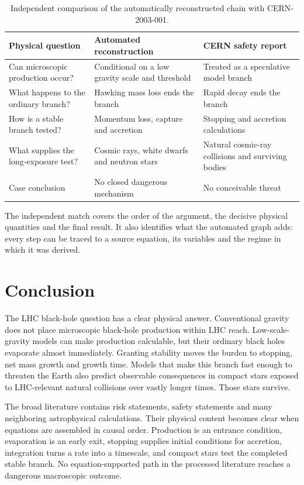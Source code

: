 \documentclass[11pt]{article}
\begin{document}
\begin{table}[H]
\centering
\caption{Independent comparison of the automatically reconstructed chain with CERN-2003-001.}
\begin{tabularx}{\linewidth}{Y Y Y}
\toprule
Physical question & Automated reconstruction & CERN safety report \\
\midrule
Can microscopic production occur? & Conditional on a low gravity scale and threshold & Treated as a speculative model branch \\
What happens to the ordinary branch? & Hawking mass loss ends the branch & Rapid decay ends the branch \\
How is a stable branch tested? & Momentum loss, capture and accretion & Stopping and accretion calculations \\
What supplies the long-exposure test? & Cosmic rays, white dwarfs and neutron stars & Natural cosmic-ray collisions and surviving bodies \\
Case conclusion & No closed dangerous mechanism & No conceivable threat \\
\bottomrule
\end{tabularx}
\end{table}

The independent match covers the order of the argument, the decisive physical quantities and the final result. It also identifies what the automated graph adds: every step can be traced to a source equation, its variables and the regime in which it was derived.

\section{Conclusion}

The LHC black-hole question has a clear physical answer. Conventional gravity does not place microscopic black-hole production within LHC reach. Low-scale-gravity models can make production calculable, but their ordinary black holes evaporate almost immediately. Granting stability moves the burden to stopping, net mass growth and growth time. Models that make this branch fast enough to threaten the Earth also predict observable consequences in compact stars exposed to LHC-relevant natural collisions over vastly longer times. Those stars survive.

The broad literature contains risk statements, safety statements and many neighboring astrophysical calculations. Their physical content becomes clear when equations are assembled in causal order. Production is an entrance condition, evaporation is an early exit, stopping supplies initial conditions for accretion, integration turns a rate into a timescale, and compact stars test the completed stable branch. No equation-supported path in the processed literature reaches a dangerous macroscopic outcome.
\end{document}

